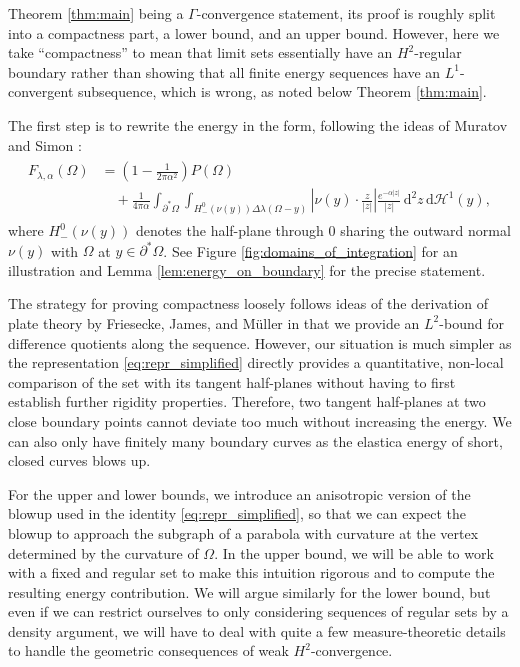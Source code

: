 \documentclass[11pt]{article}
\newcounter{statement}
\numberwithin{statement}{section}
\numberwithin{equation}{section}
\theoremstyle{remark}
\newcommand{\intd}{\, \mathrm{d}} 				%
\begin{document}
Theorem \ref{thm:main} being a $\Gamma$-convergence statement, its
proof is roughly split into a compactness part, a lower
bound, and an upper bound.  However, here we take ``compactness'' to
mean that limit sets essentially have an $H^2$-regular boundary rather
than showing that all finite energy sequences have an $L^1$-convergent
subsequence, which is wrong, as noted below Theorem
\ref{thm:main}.

The first step is to rewrite the energy in the
form, following the ideas of Muratov and Simon
\cite{muratov2018nonlocal}:
\begin{align}\label{eq:repr_simplified}
  \begin{split}
    F_{\lambda,\alpha} (\Omega) & = \left( 1-\frac{1}{2\pi\alpha^2}
    \right) P(\Omega)\\
    & \quad +\frac{1}{ 4 \pi \alpha} \int_{\partial^* \Omega}
    \int_{H^0_-(\nu(y)) \Delta \lambda (\Omega - y )} \left| \nu(y)
      \cdot \frac{z}{|z|} \right| \frac{e^{-\alpha |z|}}{ |z|} \intd^2
    z \intd \mathcal{H}^1(y),
  \end{split}
\end{align}
where $H^0_-(\nu(y))$ denotes the half-plane through
  $0$ sharing the outward normal $\nu(y)$ with $\Omega$ at
$y\in \partial^* \Omega$.  See Figure
\ref{fig:domains_of_integration} for an illustration and Lemma
\ref{lem:energy_on_boundary} for the precise statement.


        The strategy for proving compactness loosely follows ideas of
        the derivation of plate theory by Friesecke, James, and
        M{\"u}ller \cite{friesecke2002theorem} in that we provide an
        $L^2$-bound for difference quotients along the sequence.
        However, our situation is much simpler as the representation
        \eqref{eq:repr_simplified} directly provides a quantitative,
        non-local comparison of the set with its tangent half-planes
        without having to first establish further rigidity properties.
        Therefore, two tangent half-planes at two close boundary
        points cannot deviate too much without increasing the energy.
        We can also only have finitely many boundary curves as the
        elastica energy of short, closed curves blows up.

        For the upper and lower bounds, we introduce an anisotropic
        version of the blowup used in the identity
        \eqref{eq:repr_simplified}, so that we can expect the blowup
        to approach the subgraph of a parabola with curvature at the
        vertex determined by the curvature of $\Omega$.  In the
        upper bound, we will be able to work with a fixed and regular
        set to make this intuition rigorous and to compute the
        resulting energy contribution.  We will argue similarly for
        the lower bound, but even if we can restrict ourselves to only
        considering sequences of regular sets by a density argument,
        we will have to deal with quite a few measure-theoretic
        details to handle the geometric consequences of weak
        $H^2$-convergence.
        
\end{document}
